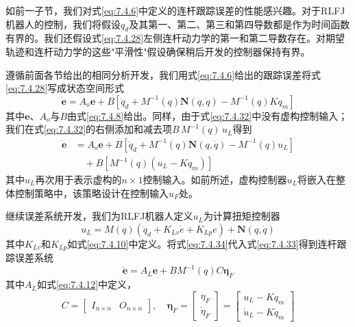\documentclass[UTF8]{ctexart}
\begin{document}
如前一子节，我们对式\eqref{eq:7.4.6}中定义的连杆跟踪误差的性能感兴趣。对于RLFJ机器人的控制，我们将假设$q_d$及其第一、第二、第三和第四导数都是作为时间函数有界的。我们还假设式\eqref{eq:7.4.28}左侧连杆动力学的第一和第二导数存在。对期望轨迹和连杆动力学的这些"平滑性"假设确保稍后开发的控制器保持有界。

遵循前面各节给出的相同分析开发，我们用式\eqref{eq:7.4.6}给出的跟踪误差将式\eqref{eq:7.4.28}写成状态空间形式
\begin{equation}\label{eq:7.4.32}
\dot{\mathbf{e}} = A_o \mathbf{e} + B\left[\ddot{q}_d + M^{-1}(q)\mathbf{N}(q,\dot{q}) - M^{-1}(q)K q_m\right]
\end{equation}
其中$\mathbf{e}$、$A_o$与$B$由式\eqref{eq:7.4.8}给出。同样，由于式\eqref{eq:7.4.32}中没有虚构控制输入；我们在式\eqref{eq:7.4.32}的右侧添加和减去项$B\,M^{-1}(q)\,u_L$得到
\begin{equation}\label{eq:7.4.33}
\begin{aligned}
\dot{\mathbf{e}} &= A_o \mathbf{e} + B\left[\ddot{q}_d + M^{-1}(q)\mathbf{N}(q,\dot{q}) - M^{-1}(q)u_L\right] \\
&\quad + B\left[M^{-1}(q)(u_L - K q_m)\right]
\end{aligned}
\end{equation}
其中$u_L$再次用于表示虚构的$n \times 1$控制输入。如前所述，虚构控制器$u_L$将嵌入在整体控制策略中，该策略设计在控制输入$u_F$处。

继续误差系统开发，我们为RLFJ机器人定义$u_L$为计算扭矩控制器
\begin{equation}\label{eq:7.4.34}
u_L = M(q)(\ddot{q}_d + K_{Lv}\dot{e} + K_{Lp}e) + \mathbf{N}(q,\dot{q})
\end{equation}
其中$K_{Lv}$和$K_{Lp}$如式\eqref{eq:7.4.10}中定义。将式\eqref{eq:7.4.34}代入式\eqref{eq:7.4.33}得到连杆跟踪误差系统
\begin{equation}\label{eq:7.4.35}
\dot{\mathbf{e}} = A_L \mathbf{e} + B M^{-1}(q) C \boldsymbol{\eta}_F
\end{equation}
其中$A_L$如式\eqref{eq:7.4.12}中定义，
\begin{equation}\label{eq:7.4.36}
C = \begin{bmatrix} I_{n \times n} & O_{n \times n} \end{bmatrix}, \quad \boldsymbol{\eta}_F = \begin{bmatrix} \eta_F \\ \dot{\eta}_F \end{bmatrix} = \begin{bmatrix} u_L - K q_m \\ \dot{u}_L - K \dot{q}_m \end{bmatrix}
\end{equation}
\end{document}
